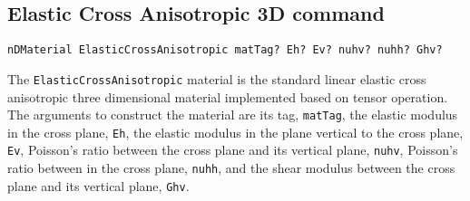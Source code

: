 \subsection{Elastic Cross Anisotropic 3D command}
\label{ECA3D}
\begin{verbatim}
nDMaterial ElasticCrossAnisotropic matTag? Eh? Ev? nuhv? nuhh? Ghv?
\end{verbatim}

The  \texttt{ElasticCrossAnisotropic}  material  is the standard linear elastic
cross anisotropic three dimensional material implemented  based  on
tensor  operation.  
The arguments to construct the material are 
its tag, \texttt{matTag}, 
the elastic modulus in the cross plane, \texttt{Eh}, 
the elastic modulus in the plane vertical to the cross plane, \texttt{Ev},
Poisson's ratio between the cross plane and its vertical plane, \texttt{nuhv},
Poisson's ratio between in the cross plane, \texttt{nuhh},
and the shear modulus between the cross plane and its vertical plane, \texttt{Ghv}.


















